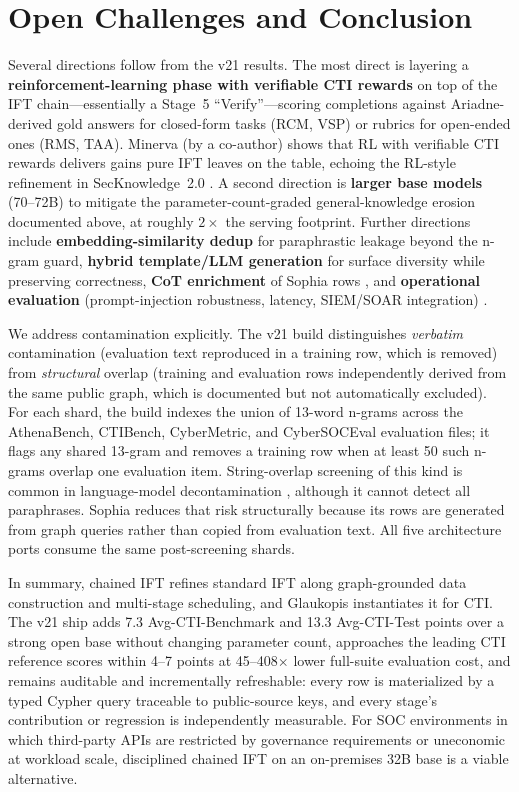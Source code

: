 \documentclass[conference]{IEEEtran}
\begin{document}
\section{Open Challenges and Conclusion}
\label{sec:open-challenges}

Several directions follow from the v21 results. The most direct is layering a \textbf{reinforcement-learning phase with verifiable CTI rewards} on top of the IFT chain---essentially a Stage~5 ``Verify''---scoring completions against Ariadne-derived gold answers for closed-form tasks (RCM, VSP) or rubrics for open-ended ones (RMS, TAA). Minerva \cite{alam2026minerva} (by a co-author) shows that RL with verifiable CTI rewards delivers gains pure IFT leaves on the table, echoing the RL-style refinement in SecKnowledge~2.0 \cite{levi2025toward}. A second direction is \textbf{larger base models} (70--72B) to mitigate the parameter-count-graded general-knowledge erosion documented above, at roughly $2\times$ the serving footprint. Further directions include \textbf{embedding-similarity dedup} for paraphrastic leakage beyond the n-gram guard, \textbf{hybrid template/LLM generation} for surface diversity while preserving correctness, \textbf{CoT enrichment} of Sophia rows \cite{levi2025toward}, and \textbf{operational evaluation} (prompt-injection robustness, latency, SIEM/SOAR integration) \cite{hu2024seceval,liu2024cyberbench,alam2025athenabench}.

We address contamination explicitly. The v21 build distinguishes \emph{verbatim} contamination (evaluation text reproduced in a training row, which is removed) from \emph{structural} overlap (training and evaluation rows independently derived from the same public graph, which is documented but not automatically excluded). For each shard, the build indexes the union of 13-word n-grams across the AthenaBench, CTIBench, CyberMetric, and CyberSOCEval evaluation files; it flags any shared 13-gram and removes a training row when at least 50 such n-grams overlap one evaluation item. String-overlap screening of this kind is common in language-model decontamination \cite{yang2023contamination,groeneveld2024olmo}, although it cannot detect all paraphrases. Sophia reduces that risk structurally because its rows are generated from graph queries rather than copied from evaluation text. All five architecture ports consume the same post-screening shards.

In summary, chained IFT refines standard IFT along graph-grounded data construction and multi-stage scheduling, and Glaukopis instantiates it for CTI. The v21 ship adds 7.3 Avg-CTI-Benchmark and 13.3 Avg-CTI-Test points over a strong open base without changing parameter count, approaches the leading CTI reference scores within 4--7 points at 45--408$\times$ lower full-suite evaluation cost, and remains auditable and incrementally refreshable: every row is materialized by a typed Cypher query traceable to public-source keys, and every stage's contribution or regression is independently measurable. For SOC environments in which third-party APIs are restricted by governance requirements or uneconomic at workload scale, disciplined chained IFT on an on-premises 32B base is a viable alternative.
\end{document}
